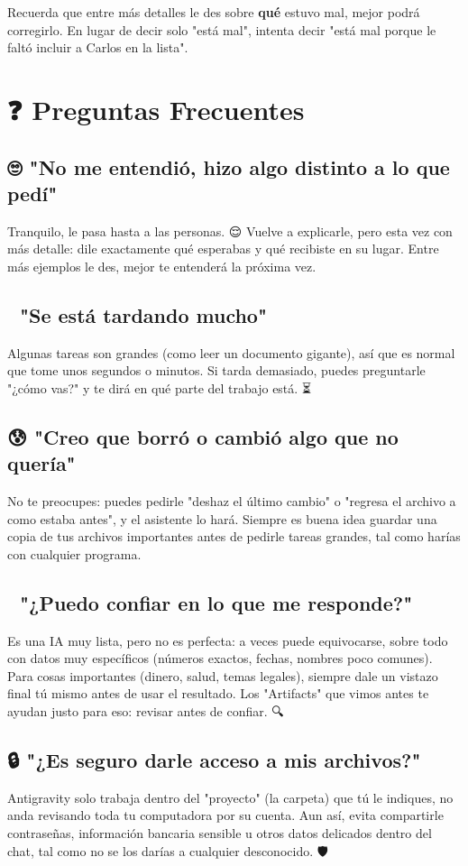 \documentclass[12pt]{article}
\begin{document}
Recuerda que entre más detalles le des sobre \textbf{qué} estuvo mal, mejor podrá corregirlo. En lugar de decir solo "está mal", intenta decir "está mal porque le faltó incluir a Carlos en la lista". 🎯

\section{❓ Preguntas Frecuentes}

\subsection{🙄 "No me entendió, hizo algo distinto a lo que pedí"}
Tranquilo, le pasa hasta a las personas. 😌 Vuelve a explicarle, pero esta vez con más detalle: dile exactamente qué esperabas y qué recibiste en su lugar. Entre más ejemplos le des, mejor te entenderá la próxima vez.

\subsection{🐢 "Se está tardando mucho"}
Algunas tareas son grandes (como leer un documento gigante), así que es normal que tome unos segundos o minutos. Si tarda demasiado, puedes preguntarle "¿cómo vas?" y te dirá en qué parte del trabajo está. ⏳

\subsection{😰 "Creo que borró o cambió algo que no quería"}
No te preocupes: puedes pedirle "deshaz el último cambio" o "regresa el archivo a como estaba antes", y el asistente lo hará. Siempre es buena idea guardar una copia de tus archivos importantes antes de pedirle tareas grandes, tal como harías con cualquier programa. 💾

\subsection{🤨 "¿Puedo confiar en lo que me responde?"}
Es una IA muy lista, pero no es perfecta: a veces puede equivocarse, sobre todo con datos muy específicos (números exactos, fechas, nombres poco comunes). Para cosas importantes (dinero, salud, temas legales), siempre dale un vistazo final tú mismo antes de usar el resultado. Los "Artifacts" que vimos antes te ayudan justo para eso: revisar antes de confiar. 🔍

\subsection{🔒 "¿Es seguro darle acceso a mis archivos?"}
Antigravity solo trabaja dentro del "proyecto" (la carpeta) que tú le indiques, no anda revisando toda tu computadora por su cuenta. Aun así, evita compartirle contraseñas, información bancaria sensible u otros datos delicados dentro del chat, tal como no se los darías a cualquier desconocido. 🛡️
\end{document}
